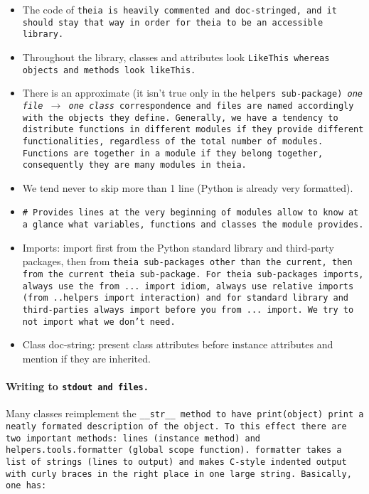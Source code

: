 \documentclass{article}
\begin{document}
\begin{itemize}
\item The code of \tt{theia} is heavily commented and doc-stringed, and it should stay that way in order for \tt{theia} to be an accessible library.

\item Throughout the library, classes and attributes look \tt{LikeThis} whereas objects and methods look \tt{likeThis}.

\item There is an approximate (it isn't true only in the \tt{helpers} sub-package) \textit{one file} $\rightarrow$ \textit{one class} correspondence and files are named accordingly with the objects they define. Generally, we have a tendency to distribute functions in different modules if they provide different functionalities, regardless of the total number of modules. Functions are together in a module if they belong together, consequently they are many modules in theia.

\item We tend never to skip more than 1 line (Python is already very formatted).

\item \tt{\# Provides} lines at the very beginning of modules allow to know at a glance what variables, functions and classes the module provides.

\item Imports: import first from the Python standard library and third-party packages, then from \tt{theia} sub-packages other than the current, then from the current \tt{theia} sub-package. For \tt{theia} sub-packages imports, always use the \tt{from ... import} idiom, always use relative imports (\tt{from ..helpers import interaction}) and for standard library and third-parties always \tt{import} before you \tt{from ... import}. We try to not import what we don't need.

\item Class doc-string: present class attributes before instance attributes and mention if they are inherited.
\end{itemize}

\paragraph{Writing to \tt{stdout} and files.}Many classes reimplement the \tt{\_\_str\_\_} method to have \tt{print(object)} print a neatly formated description of the object. To this effect there are two important methods: \tt{lines} (instance method) and \tt{helpers.tools.formatter} (global scope function). \tt{formatter} takes a list of strings (lines to output) and makes C-style indented output with curly braces in the right place in one large string. Basically, one has:
\end{document}
